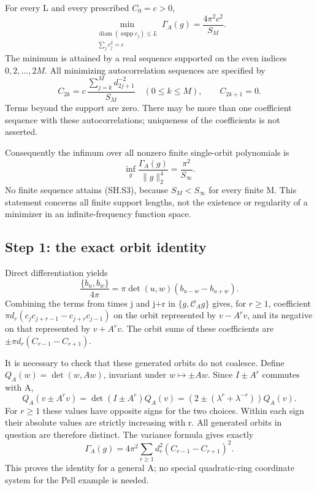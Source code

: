 \begin{theorem}\label{pass1:sharp-1} For every L and every prescribed \(C_0=c>0\), \[
 \boxed{\displaystyle
 \min_{\substack{\operatorname{diam}(\operatorname{supp}c_j)\leq L\\
                 \sum_jc_j^2=c}}
       \Gamma_A(g)=\frac{4\pi^2c^2}{S_M}.}                 \tag{SH.S1}
\] The minimum is attained by a real sequence supported on the even indices \(0,2,\ldots,2M\). All minimizing autocorrelation sequences are specified by \[
 C_{2k}=c\,\frac{\sum_{j=k}^M d_{2j+1}^{-2}}{S_M}
          \quad(0\leq k\leq M),\qquad C_{2k+1}=0.           \tag{SH.S2}
\] Terms beyond the support are zero. There may be more than one coefficient sequence with these autocorrelations; uniqueness of the coefficients is not asserted.
\end{theorem}

Consequently the infimum over all nonzero finite single-orbit polynomials is \[
 \boxed{\displaystyle
 \inf_g\frac{\Gamma_A(g)}{\|g\|_2^4}
                   =\frac{\pi^2}{S_\infty}.}               \tag{SH.S3}
\] No finite sequence attains (SH.S3), because \(S_M<S_\infty\) for every finite M. This statement concerns all finite support lengths, not the existence or regularity of a minimizer in an infinite-frequency function space.

\subsection{Step 1: the exact orbit identity}\label{sharp:step-1-the-exact-orbit-identity}

Direct differentiation yields \[
 \frac{\{b_u,b_w\}}{4\pi}
        =\pi\det(u,w)(b_{u-w}-b_{u+w}).
\] Combining the terms from times j and j+r in \(\{g,\mathcal C_Ag\}\) gives, for \(r\geq1\), coefficient \(\pi d_r(c_jc_{j+r-1}-c_{j+r}c_{j-1})\) on the orbit represented by \(v-A^rv\), and its negative on that represented by \(v+A^rv\). The orbit sums of these coefficients are \(\pm\pi d_r(C_{r-1}-C_{r+1})\).

It is necessary to check that these generated orbits do not coalesce. Define \(Q_A(w)=\det(w,Aw)\), invariant under \(w\mapsto\pm Aw\). Since \(I\pm A^r\) commutes with A, \[
 Q_A(v\pm A^rv)=\det(I\pm A^r)Q_A(v)
             =(2\pm(\lambda^r+\lambda^{-r}))Q_A(v).        \tag{SH.S4}
\] For \(r\geq1\) these values have opposite signs for the two choices. Within each sign their absolute values are strictly increasing with r. All generated orbits in question are therefore distinct. The variance formula gives exactly \[
 \boxed{\displaystyle
 \Gamma_A(g)=4\pi^2\sum_{r\geq1}
                    d_r^2(C_{r-1}-C_{r+1})^2.}             \tag{SH.S5}
\] This proves the identity for a general A; no special quadratic-ring coordinate system for the Pell example is needed.

